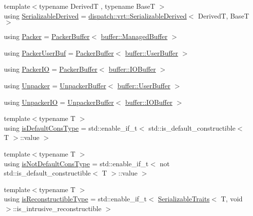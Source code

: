 \begin{DoxyCompactItemize}
{\footnotesize template$<$typename DerivedT , typename BaseT $>$ }\\using \hyperlink{namespacecheckpoint_a9c4afb2c8d1bc1f58b9e158d64331d65}{Serializable\+Derived} = \hyperlink{structcheckpoint_1_1dispatch_1_1vrt_1_1_serializable_derived}{dispatch\+::vrt\+::\+Serializable\+Derived}$<$ DerivedT, BaseT $>$
\item 
using \hyperlink{namespacecheckpoint_ad744c208c7b1da6ee19c10d071e74f7d}{Packer} = \hyperlink{structcheckpoint_1_1_packer_buffer}{Packer\+Buffer}$<$ \hyperlink{structcheckpoint_1_1buffer_1_1_managed_buffer}{buffer\+::\+Managed\+Buffer} $>$
\item 
using \hyperlink{namespacecheckpoint_a72c31e3d94e3b4d05bca5972bacc536a}{Packer\+User\+Buf} = \hyperlink{structcheckpoint_1_1_packer_buffer}{Packer\+Buffer}$<$ \hyperlink{structcheckpoint_1_1buffer_1_1_user_buffer}{buffer\+::\+User\+Buffer} $>$
\item 
using \hyperlink{namespacecheckpoint_a0c8b3f2f174fd1076b410c7a2128919b}{Packer\+IO} = \hyperlink{structcheckpoint_1_1_packer_buffer}{Packer\+Buffer}$<$ \hyperlink{structcheckpoint_1_1buffer_1_1_i_o_buffer}{buffer\+::\+I\+O\+Buffer} $>$
\item 
using \hyperlink{namespacecheckpoint_af36cfec8b3ef7476bb97b3b12908370d}{Unpacker} = \hyperlink{structcheckpoint_1_1_unpacker_buffer}{Unpacker\+Buffer}$<$ \hyperlink{structcheckpoint_1_1buffer_1_1_user_buffer}{buffer\+::\+User\+Buffer} $>$
\item 
using \hyperlink{namespacecheckpoint_a0efc06d99dce79e452b9d1b503059a74}{Unpacker\+IO} = \hyperlink{structcheckpoint_1_1_unpacker_buffer}{Unpacker\+Buffer}$<$ \hyperlink{structcheckpoint_1_1buffer_1_1_i_o_buffer}{buffer\+::\+I\+O\+Buffer} $>$
\item 
{\footnotesize template$<$typename T $>$ }\\using \hyperlink{namespacecheckpoint_a58224a3b056d9e2aa73d563871981a7d}{is\+Default\+Cons\+Type} = std\+::enable\+\_\+if\+\_\+t$<$ std\+::is\+\_\+default\+\_\+constructible$<$ T $>$\+::value $>$
\item 
{\footnotesize template$<$typename T $>$ }\\using \hyperlink{namespacecheckpoint_a4032c86e7c92702198dd675a2696ee2c}{is\+Not\+Default\+Cons\+Type} = std\+::enable\+\_\+if\+\_\+t$<$ not std\+::is\+\_\+default\+\_\+constructible$<$ T $>$\+::value $>$
\item 
{\footnotesize template$<$typename T $>$ }\\using \hyperlink{namespacecheckpoint_a126da7cae6bbbec231bb2552dc3ad6cc}{is\+Reconstructible\+Type} = std\+::enable\+\_\+if\+\_\+t$<$ \hyperlink{structcheckpoint_1_1_serializable_traits}{Serializable\+Traits}$<$ T, void $>$\+::is\+\_\+intrusive\+\_\+reconstructible $>$

\end{DoxyCompactItemize}
